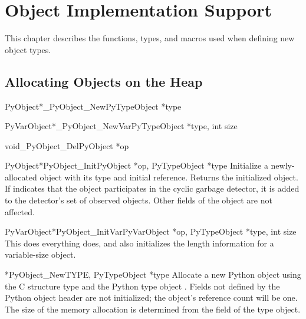 \chapter{Object Implementation Support \label{newTypes}}


This chapter describes the functions, types, and macros used when
defining new object types.


\section{Allocating Objects on the Heap
         \label{allocating-objects}}

\begin{cfuncdesc}{PyObject*}{_PyObject_New}{PyTypeObject *type}
\end{cfuncdesc}

\begin{cfuncdesc}{PyVarObject*}{_PyObject_NewVar}{PyTypeObject *type, int size}
\end{cfuncdesc}

\begin{cfuncdesc}{void}{_PyObject_Del}{PyObject *op}
\end{cfuncdesc}

\begin{cfuncdesc}{PyObject*}{PyObject_Init}{PyObject *op,
					    PyTypeObject *type}
  Initialize a newly-allocated object  with its type and
  initial reference.  Returns the initialized object.  If 
  indicates that the object participates in the cyclic garbage
  detector, it is added to the detector's set of observed objects.
  Other fields of the object are not affected.
\end{cfuncdesc}

\begin{cfuncdesc}{PyVarObject*}{PyObject_InitVar}{PyVarObject *op,
						  PyTypeObject *type, int size}
  This does everything  does, and also
  initializes the length information for a variable-size object.
\end{cfuncdesc}

\begin{cfuncdesc}{*}{PyObject_New}{TYPE, PyTypeObject *type}
  Allocate a new Python object using the C structure type 
  and the Python type object .  Fields not defined by the
  Python object header are not initialized; the object's reference
  count will be one.  The size of the memory
  allocation is determined from the  field of the
  type object.
\end{cfuncdesc}

